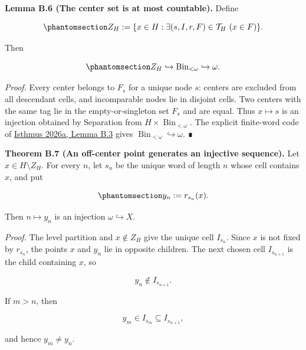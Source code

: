 \documentclass[
  english,
  11pt,
  reqno]{amsart}
\begin{document}
\protect{}\label{lem:b-6-center-countability}

\textbf{Lemma B.6 (The center set is at most countable).} Define

\begin{equation}\protect\phantomsection\label{eq:typefree-center-set}{
Z_H
:=
\{x\in H:\exists(s,I,r,F)\in\mathcal T_H\ (x\in F)\}.
}\end{equation}

Then

\begin{equation}\protect\phantomsection\label{eq:typefree-center-countable}{
Z_H\hookrightarrow\operatorname{Bin}_{<\omega}\hookrightarrow\omega.
}\end{equation}

\emph{Proof.} Every center belongs to \(F_s\) for a unique node \(s\):
centers are excluded from all descendant cells, and incomparable nodes
lie in disjoint cells. Two centers with the same tag lie in the
empty-or-singleton set \(F_s\) and are equal. Thus \(x\mapsto s\) is an
injection obtained by Separation from
\(H\times\operatorname{Bin}_{<\omega}\). The explicit finite-word code
of \hyperref[ref:isthmus2026a]{Isthmus 2026a, Lemma B.3} gives
\(\operatorname{Bin}_{<\omega}\hookrightarrow\omega\). ∎

\protect{}\label{thm:b-7-off-center}

\textbf{Theorem B.7 (An off-center point generates an injective
sequence).} Let \(x\in H\setminus Z_H\). For every \(n\), let \(s_n\) be
the unique word of length \(n\) whose cell contains \(x\), and put

\begin{equation}\protect\phantomsection\label{eq:typefree-off-center-sequence}{
y_n:=r_{s_n}(x).
}\end{equation}

Then \(n\mapsto y_n\) is an injection \(\omega\hookrightarrow X\).

\emph{Proof.} The level partition and \(x\notin Z_H\) give the unique
cell \(I_{s_n}\). Since \(x\) is not fixed by \(r_{s_n}\), the points
\(x\) and \(y_n\) lie in opposite children. The next chosen cell
\(I_{s_{n+1}}\) is the child containing \(x\), so

\[
y_n\notin I_{s_{n+1}}.
\]

If \(m>n\), then

\[
y_m\in I_{s_m}\subseteq I_{s_{n+1}},
\]

and hence \(y_m\ne y_n\).
\end{document}
